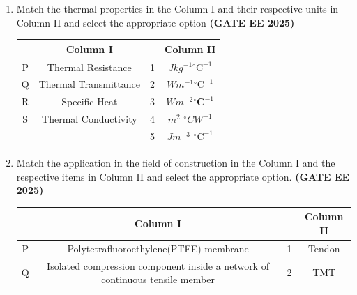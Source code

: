 \documentclass[journal,12pt,onecolumn]{IEEEtran}
\theoremstyle{remark}
\begin{document}
\begin{enumerate}
 \begin{enumerate}
 \end{enumerate}
 \item Match the thermal properties in the Column I and their respective units in Column II and select the appropriate option \hfill \textbf{(GATE EE 2025)}\\
 \begin{tabular}{|c|c|c|c|} \hline
  & Column I &  & Column II \\ \hline
P & Thermal Resistance&1& $J kg^{-1}$$ ^\circ\text{C}^{-1}$\\ \hline
 Q &Thermal Transmittance&2&$W m^{-1}$$^\circ\text{C}^{-1}$\\ \hline 
 R & Specific Heat &3& $W m^{-2}$$^\circ\textbf{C}^{-1}$\\ \hline
 S & Thermal Conductivity &4 & $m^2$ $^\circ{C}$$W^{-1}$ \\ \hline
  & & 5 & $J m^{-3}$ $^\circ\text{C}^{-1}$\\ \hline
 \end{tabular}
 \begin{enumerate}
 \end{enumerate}
 \item Match the application in the field of construction in the Column I and the respective items in Column II and select the appropriate option. \hfill \textbf{(GATE EE 2025)} \\
 \begin{tabular}{|c|c|c|c|} \hline
  & Column I & & Column II \\ \hline
P &Polytetrafluoroethylene(PTFE) membrane &1 &Tendon  \\ \hline
 Q&Isolated compression component inside a network of continuous tensile member&2&TMT\\ \hline

\end{tabular}
\end{enumerate}
\end{document}
